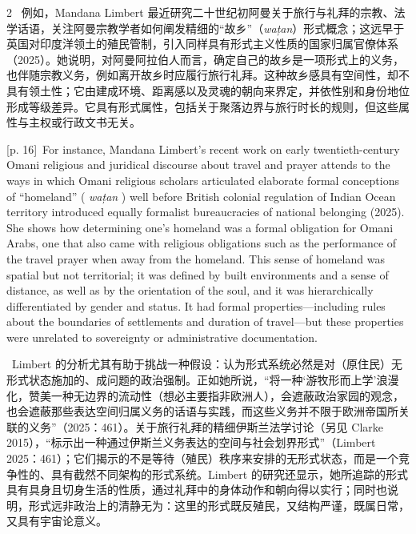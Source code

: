 \documentclass[10pt,a4paper]{article}
\begin{document}
\begin{paracol}{2}
\switchcolumn*
{\scriptsize\color{gray} [p. 16]}\ 例如，Mandana Limbert 最近研究二十世纪初阿曼关于旅行与礼拜的宗教、法学话语，关注阿曼宗教学者如何阐发精细的“故乡”（\textit{wațan}）形式概念；这远早于英国对印度洋领土的殖民管制，引入同样具有形式主义性质的国家归属官僚体系（2025）。她说明，对阿曼阿拉伯人而言，确定自己的故乡是一项形式上的义务，也伴随宗教义务，例如离开故乡时应履行旅行礼拜。这种故乡感具有空间性，却不具有领土性；它由建成环境、距离感以及灵魂的朝向来界定，并依性别和身份地位形成等级差异。它具有形式属性，包括关于聚落边界与旅行时长的规则，但这些属性与主权或行政文书无关。\par
\switchcolumn
{\scriptsize\color{gray} [p. 16]}\ For instance, Mandana Limbert’s recent work on early twentieth-century Omani religious and juridical discourse about travel and prayer attends to the ways in which Omani religious scholars articulated elaborate formal conceptions of “homeland” ( \textit{wațan} ) well before British colonial regulation of Indian Ocean territory introduced equally formalist bureaucracies of national belonging (2025). She shows how determining one’s homeland was a formal obligation for Omani Arabs, one that also came with religious obligations such as the performance of the travel prayer when away from the homeland. This sense of homeland was spatial but not territorial; it was defined by built environments and a sense of distance, as well as by the orientation of the soul, and it was hierarchically differentiated by gender and status. It had formal properties—including rules about the boundaries of settlements and duration of travel—but these properties were unrelated to sovereignty or administrative documentation.\par
\switchcolumn*
{\scriptsize\color{gray} [p. 16]}\ Limbert 的分析尤其有助于挑战一种假设：认为形式系统必然是对（原住民）无形式状态施加的、成问题的政治强制。正如她所说，“将一种‘游牧形而上学’浪漫化，赞美一种无边界的流动性（想必主要指非欧洲人），会遮蔽政治家园的观念，也会遮蔽那些表达空间归属义务的话语与实践，而这些义务并不限于欧洲帝国所关联的义务”（2025：461）。关于旅行礼拜的精细伊斯兰法学讨论（另见 Clarke 2015），“标示出一种通过伊斯兰义务表达的空间与社会划界形式”（Limbert 2025：461）；它们揭示的不是等待（殖民）秩序来安排的无形式状态，而是一个竞争性的、具有截然不同架构的形式系统。Limbert 的研究还显示，她所追踪的形式具有具身且切身生活的性质，通过礼拜中的身体动作和朝向得以实行；同时也说明，形式远非政治上的清静无为：这里的形式既反殖民，又结构严谨，既属日常，又具有宇宙论意义。\par
\switchcolumn

\end{paracol}
\end{document}
